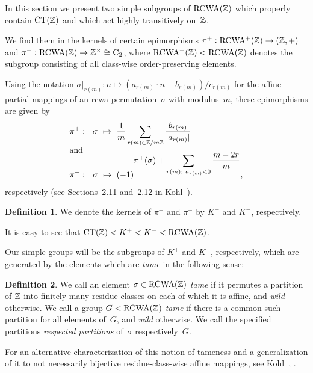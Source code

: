 \documentclass{amsart}
\theoremstyle{definition} \newtheorem{CTZDefinition}{Definition}[section]
\theoremstyle{plain}      \newtheorem{CTZPropertiesTheorem}[CTZDefinition]{Theorem}
\theoremstyle{plain}      \newtheorem{CTZSubgroupsTheorem}[CTZDefinition]{Theorem}
\theoremstyle{definition} \newtheorem{RcwaMappingDefinition}{Definition}[section]
\theoremstyle{definition} \newtheorem{RCWADefinition}[RcwaMappingDefinition]{Definition}
\theoremstyle{plain}      \newtheorem{CTZNotFinitelyGeneratedTheorem}
\theoremstyle{definition} \newtheorem{CTZSmEmbeddingDefinition}[RcwaMappingDefinition]{Definition}
\theoremstyle{plain}      \newtheorem{CTZHighlyTransitiveTheorem}[RcwaMappingDefinition]{Theorem}
\theoremstyle{plain}      \newtheorem{CTZTorsionElementsDivisibleTheorem}
\theoremstyle{plain}      \newtheorem{CTLemma}{Lemma}[section]
\theoremstyle{plain}      \newtheorem{IntegralCommutatorLemma}[CTLemma]{Lemma}
\theoremstyle{plain}      \newtheorem{NormalSubgroupContainsIntegralElementLemma}[CTLemma]{Lemma}
\theoremstyle{plain}      \newtheorem{CTZSimpleTheorem}[CTLemma]{Theorem}
\theoremstyle{remark}     \newtheorem{CTZSimpleRemark}[CTLemma]{Remark}
\theoremstyle{definition} \newtheorem{CTPZDefinition}[CTLemma]{Definition}
\theoremstyle{plain}      \newtheorem{CTPZSimpleCorollary}[CTLemma]{Corollary}
\theoremstyle{plain}      \newtheorem{CTPZSimpleProblem}[CTLemma]{Problem}
\theoremstyle{plain}      \newtheorem{FnPSL2ZEmbeddingTheorem}{Theorem}[section]
\theoremstyle{plain}      \newtheorem{FreeProductEmbeddingTheorem}[FnPSL2ZEmbeddingTheorem]{Theorem}
\theoremstyle{definition} \newtheorem{RestrictionMonomorphismDefinition}
\theoremstyle{plain}      \newtheorem{DirectAndWreathProductsEmbeddingTheorem}
\theoremstyle{plain}      \newtheorem{DirectAndWreathProductsEmbeddingCorollary}
\theoremstyle{definition} \newtheorem{CTintZDefinition}[FnPSL2ZEmbeddingTheorem]{Definition}
\theoremstyle{plain}      \newtheorem{CTintZSimpleTheorem}[FnPSL2ZEmbeddingTheorem]{Theorem}
\theoremstyle{definition} \newtheorem{KernelDefinition}{Definition}[section]
\theoremstyle{definition} \newtheorem{TameWildDefinition}[KernelDefinition]{Definition}
\theoremstyle{definition} \newtheorem{SimpleSupergroupsDefinition}[KernelDefinition]{Definition}
\theoremstyle{definition} \newtheorem{CSCRDefinition}[KernelDefinition]{Definition}
\theoremstyle{plain}      \newtheorem{SimpleSupergroupsGeneratorsTheorem}[KernelDefinition]{Theorem}
\theoremstyle{plain}      \newtheorem{SimpleSupergroupsTheorem}[KernelDefinition]{Theorem}
\theoremstyle{plain}      \newtheorem{SimpleSupergroupsTransitivityTheorem}
\theoremstyle{plain}      \newtheorem{TameGenerationConjecture}[KernelDefinition]{Conjecture}
\theoremstyle{remark}     \newtheorem{TameGenerationRemark}[KernelDefinition]{Remark}
\begin{document}
In this section we present two simple subgroups of \(\RCWA{\ZZ}\) which properly contain
\(\CT{\ZZ}\) and which act highly transitively on~\(\mathbb{Z}\).

We find them in the kernels of certain epimorphisms \(\pi^+: \RCWAp{\ZZ} \rightarrow (\ZZ,+)\)
and \(\pi^-: \RCWA{\ZZ} \rightarrow \Units{\ZZ} \cong \C{2}\), where \(\RCWAp{\ZZ} < \RCWA{\ZZ}\)
denotes the subgroup consisting of all class-wise order-preserving elements.

Using the notation \(\sigma|_{r(m)}: n \mapsto (a_{r(m)} \cdot n + b_{r(m)})/c_{r(m)}\)
for the affine partial mappings of an rcwa permutation~\(\sigma\) with modulus~\(m\), these
epimorphisms are given by
\begin{align*}
  &\pi^+: \ \ \sigma \ \mapsto \
  \displaystyle{\frac{1}{m} \sum_{r(m) \in \mathbb{Z}/m\mathbb{Z}} \frac{b_{r(m)}}{|a_{r(m)}|}} \\[-2mm]
\intertext{and} \\[-9mm]
  &\pi^-: \ \ \sigma \ \mapsto \
  (-1)^{\displaystyle{\pi^+(\sigma) + \sum_{r(m): \ a_{r(m)} < 0} \frac{m - 2r}{m}}},
\end{align*}
respectively (see Sections~2.11 and~2.12 in Kohl~\cite{Kohl05b}).

\begin{KernelDefinition} \label{KernelDefinition}
  We denote the kernels of \(\pi^+\) and \(\pi^-\) by \(K^+\) and \(K^-\), respectively.
\end{KernelDefinition}

\noindent It is easy to see that \(\CT{\ZZ} < K^+ < K^- < \RCWA{\ZZ}\).

Our simple groups will be the subgroups of \(K^+\) and \(K^-\), respectively, which are generated
by the elements which are \emph{tame} in the following sense:

\begin{TameWildDefinition} \label{TameWildDefinition}
  We call an element \(\sigma \in \RCWA{\ZZ}\) \emph{tame} if it permutes a partition of \(\mathbb{Z}\)
  into finitely many residue classes on each of which it is affine, and \emph{wild} otherwise.
  We call a group \(G < \RCWA{\ZZ}\) \emph{tame} if there is a common such partition for all
  elements of~\(G\), and \emph{wild} otherwise. We call the specified partitions \emph{respected
  partitions} of~\(\sigma\) respectively~\(G\).
\end{TameWildDefinition}

\noindent For an alternative characterization of this notion of tameness and a generalization
of it to not necessarily bijective residue-class-wise affine mappings, see Kohl~\cite{Kohl05b},
\cite{Kohl07a}.
\end{document}
